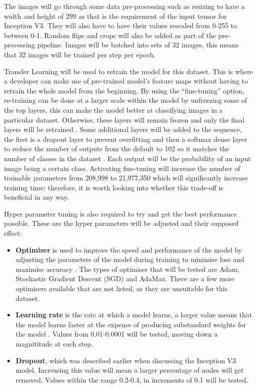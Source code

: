 \documentclass[12pt,a4paper]{report}
\begin{document}
The images will go through some data pre-processing such as resizing to have a width and height of 299 as that is the 
requirement of the input tensor for Inception V3. They will also have to have their values rescaled from 0-255 to 
between 0-1. Random flips and crops will also be added as part of the pre-processing pipeline. Images will be batched 
into sets of 32 images, this means that 32 images will be trained per step per epoch. 

\par

Transfer Learning will be used to retrain the model for this dataset. This is where a developer can make use of 
pre-trained model's feature maps without having to retrain the whole model from the beginning. By using the 
“fine-tuning” option, re-training can be done at a larger scale within the model by unfreezing some of the top layers, 
this can make the model better at classifying images in a particular dataset. Otherwise, these layers will 
remain frozen and only the final layers will be retrained \citep{transfer}. Some additional layers will be added to the 
sequence, the 
first is a dropout layer to prevent overfitting and then a softmax dense layer to reduce the number of outputs from the default 
to 102 so it matches the number of classes in the dataset \citep{denselayer}. Each output will be the probability of an 
input image being a
certain class. Activating fine-tuning will increase the number of trainable parameters from 208,998 to 21,977,350 which 
will significantly increase training time; therefore, it is worth looking into whether this trade-off is beneficial in 
any way.

\par

Hyper parameter tuning is also 
required to try and get the best performance possible. These are the hyper parameters will be adjusted and
their supposed effect:

\begin{itemize}
    \item \textbf{Optimiser} is used to improve the speed and performance of the model by adjusting the parameters of the 
    model during training to minimise loss and maximise accuracy \citep{maithani}. The types of optimiser that will be
    tested are Adam, Stochastic Gradient Descent (SGD) and AdaMax. There are a few more optimisers 
    available that are not listed, as they are unsuitable for this dataset.
    \item \textbf{Learning rate} is the rate at which a model learns, a larger value means that the model learns faster 
    at the expense of producing substandard weights for the model \citep{andreaperlato}. Values from 0.01-0.0001 will
    be tested, moving down a magnititude at each step. 
    \item \textbf{Dropout}, which was described earlier when discussing the Inception V3 model. Increasing this value 
    will mean a larger percentage of nodes will get removed. Values within the range 0.2-0.4, in increments of 0.1 
    will be tested.
\end{itemize}
\end{document}
